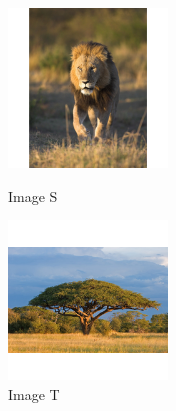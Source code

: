 \documentclass{article}
\begin{document}
\begin{figure}[!htb]
   \begin{minipage}{0.33\textwidth}
     \centering
     \includegraphics[width = 120pt]{Annexe/lio.png}
     \caption{Image S}
      \end{minipage}\hfill
   \begin{minipage}{0.33\textwidth}
     \centering
     \includegraphics[width = 120pt]{Annexe/arbre.png}
     \caption{Image T}
      \end{minipage}\hfill
      \end{figure}
\end{document}
